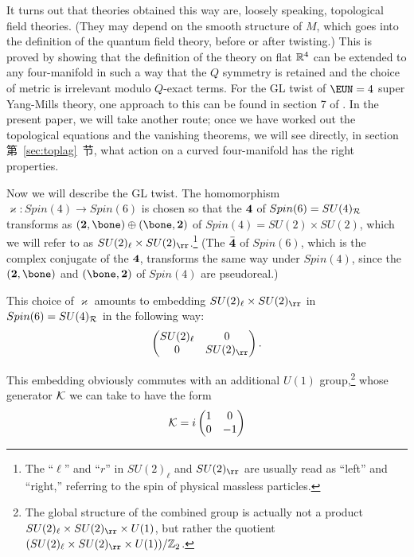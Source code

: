 It turns out that theories obtained this way are, loosely
speaking, topological field theories. (They may depend on the
smooth structure of $M$, which goes into the definition of the
quantum field theory, before or after twisting.) This is proved by
showing that the definition of the theory on flat $\Bbb{R}^4$ can
be extended to any four-manifold in such a way that the $Q$
symmetry is retained and the choice of metric is irrelevant modulo
$Q$-exact terms.
 For the GL twist of ${\EUN}=4$ super Yang-Mills theory,
 one approach to this can be found in section 7 of \cite{ref56}. In
the present paper, we will take another route; once we have worked
out the topological equations and the vanishing theorems, we will
see directly, in section 第~\ref{sec:toplag}~节, what action on a curved
four-manifold has the right properties.

\par{}

Now we will describe the GL twist. The homomorphism
$\varkappa:Spin(4)\to Spin(6)$ is chosen so that the ${\bf 4}$ of
$Spin(6)=SU(4)_{{\cal R}}$ transforms as $({\bf 2},\bone)\oplus
(\bone,{\bf  2})$ of $Spin(4)=SU(2)\times SU(2)$, which we will
refer to as $SU(2)_\ell\times SU(2)_\rr$.\footnote{ The ``$\ell$'' and
``$r$'' in $SU(2)_\ell$ and $SU(2)_\rr$ are usually read as
``left'' and ``right,'' referring to the spin of physical massless
particles.} (The $\bar{\bf 4}$ of $Spin(6)$, which is the complex
conjugate of the ${\bf 4}$, transforms the same way under
$Spin(4)$, since the $({\bf 2},\bone)$ and $(\bone,{\bf 2})$ of
$Spin(4)$ are pseudoreal.)

This choice of $\varkappa$ amounts to embedding $SU(2)_\ell\times
SU(2)_\rr$ in $Spin(6)=SU(4)_{{\cal R}}$ in the following way:
\setcounter{equation}{1}
\begin{equation}\label{eq:norml}
\left(\begin{matrix}SU(2)_\ell &  0 \\
                                                  0    &
                                                  SU(2)_\rr\\\end{matrix}\right).
\end{equation}

This embedding obviously commutes with an additional $U(1)$
group,\footnote{The global structure of the combined  group is
actually not a product $SU(2)_\ell\times SU(2)_\rr\times U(1)$,
but rather the quotient $(SU(2)_\ell\times SU(2)_\rr\times
U(1))/\Bbb{Z}_2$.} whose generator ${\cal K}$ we can take to have
the form %
\setcounter{equation}{2}
\begin{equation}\label{eq:orml}
{\cal K}=i\left(\begin{matrix}1&  0 \\
                                                  0    &
                                                  -1\\\end{matrix}\right)
\end{equation}

